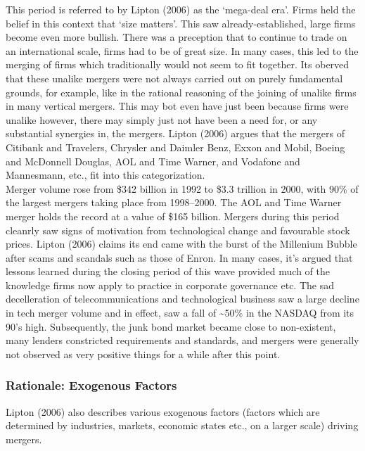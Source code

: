 \documentclass[11pt, english]{article}
\begin{document}
        This period is referred to by Lipton (2006) as the `mega-deal era'. Firms held the belief in this context that `size matters'. This saw already-established, large firms become even more bullish. There was a preception that to continue to trade on an international scale, firms had to be of great size. In many cases, this led to the merging of firms which traditionally would not seem to fit together. Its oberved that these unalike mergers were not always carried out on purely fundamental grounds, for example, like in the rational reasoning of the joining of unalike firms in many vertical mergers. This may bot even have just been because firms were unalike however, there may simply just not have been a need for, or any substantial synergies in, the mergers. Lipton (2006) argues that the mergers of Citibank and Travelers, Chrysler and Daimler Benz, Exxon and Mobil, Boeing and McDonnell Douglas, AOL and Time Warner, and Vodafone and Mannesmann, etc., fit into this categorization.\\

        Merger volume rose from \$342 billion in 1992 to \$3.3 trillion in 2000, with 90\% of the largest mergers taking place from 1998--2000. The AOL and Time Warner merger holds the record at a value of \$165 billion. Mergers during this period cleanrly saw signs of motivation from technological change and favourable stock prices. Lipton (2006) claims its end came with the burst of the Millenium Bubble after scams and scandals such as those of Enron. In many cases, it's argued that lessons learned during the closing period of this wave provided much of the knowledge firms now apply to practice in corporate governance etc. The sad decelleration of telecommunications and technological business saw a large decline in tech merger volume and in effect, saw a fall of \~{}50\% in the NASDAQ from its 90's high. Subsequently, the junk bond market became close to non-existent, many lenders constricted requirements and standards, and mergers were generally not observed as very positive things for a while after this point.

		\subsubsection*{Rationale: Exogenous Factors}

        Lipton (2006) also describes various exogenous factors (factors which are determined by industries, markets, economic states etc., on a larger scale) driving mergers.
\end{document}
